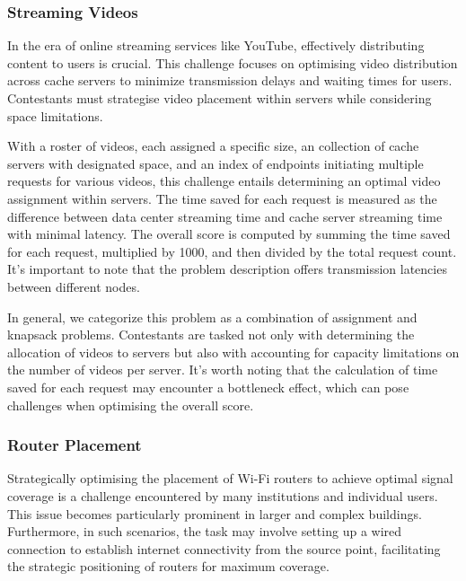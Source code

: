 \subsubsection*{Streaming Videos}
\label{subsubsec:hashcode-2017-qualification}

In the era of online streaming services like YouTube, effectively distributing
content to users is crucial. This challenge focuses on optimising video
distribution across cache servers to minimize transmission delays and waiting
times for users. Contestants must strategise video placement within servers
while considering space limitations.

With a roster of videos, each assigned a specific size, an collection of cache
servers with designated space, and an index of endpoints initiating multiple
requests for various videos, this challenge entails determining an optimal
video assignment within servers. The time saved for each request is measured as the
difference between data center streaming time and cache server streaming time
with minimal latency. The overall score is computed by summing the time saved
for each request, multiplied by 1000, and then divided by the total request
count. It's important to note that the problem description offers transmission
latencies between different nodes.

In general, we categorize this problem as a combination of assignment and
knapsack problems. Contestants are tasked not only with determining the
allocation of videos to servers but also with accounting for capacity
limitations on the number of videos per server. It's worth noting that the
calculation of time saved for each request may encounter a bottleneck effect,
which can pose challenges when optimising the overall score.

\subsubsection*{Router Placement}
\label{subsubsec:hashcode-2017-final}

Strategically optimising the placement of Wi-Fi routers to achieve optimal
signal coverage is a challenge encountered by many institutions and individual
users. This issue becomes particularly prominent in larger and complex
buildings. Furthermore, in such scenarios, the task may involve setting up a wired
connection to establish internet connectivity from the source point,
facilitating the strategic positioning of routers for maximum coverage.

